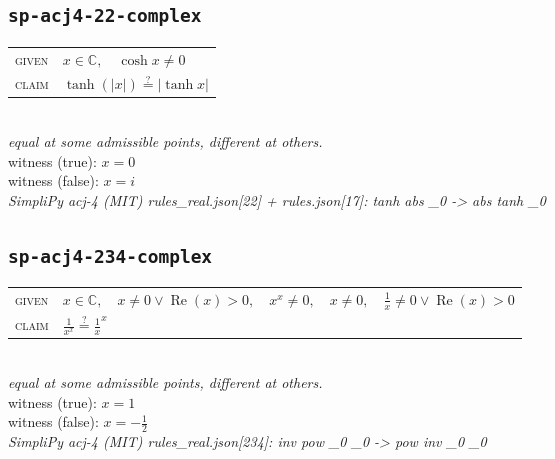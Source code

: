 \documentclass[11pt]{article}
\begin{document}
\subsection*{\texttt{sp-acj4-22-complex}}
\begin{tabular}{@{}l@{\quad}l@{}}
\textsc{given} & $x \in \mathbb{C},\quad \cosh x \neq 0$ \\[4pt]
\textsc{claim} & $\displaystyle \tanh\left(\left|x\right|\right) \overset{?}{=} \left|\tanh x\right|$ \\
\end{tabular}\\[2pt]
{\small\emph{equal at some admissible points, different at others.}}\\
{\footnotesize\color{gray}witness (true): $x = 0$}\\
{\footnotesize\color{gray}witness (false): $x = i$}\\
\emph{SimpliPy acj-4 (MIT) rules\_real.json[22] + rules.json[17]: tanh abs \_0  ->  abs tanh \_0}\\

\subsection*{\texttt{sp-acj4-234-complex}}
\begin{tabular}{@{}l@{\quad}l@{}}
\textsc{given} & $x \in \mathbb{C},\quad x \neq 0 \lor \operatorname{Re}\left(x\right) > 0,\quad x^{x} \neq 0,\quad x \neq 0,\quad \frac{1}{x} \neq 0 \lor \operatorname{Re}\left(x\right) > 0$ \\[4pt]
\textsc{claim} & $\displaystyle \frac{1}{x^{x}} \overset{?}{=} \frac{1}{x}^{x}$ \\
\end{tabular}\\[2pt]
{\small\emph{equal at some admissible points, different at others.}}\\
{\footnotesize\color{gray}witness (true): $x = 1$}\\
{\footnotesize\color{gray}witness (false): $x = -\frac{1}{2}$}\\
\emph{SimpliPy acj-4 (MIT) rules\_real.json[234]: inv pow \_0 \_0  ->  pow inv \_0 \_0}\\
\end{document}

